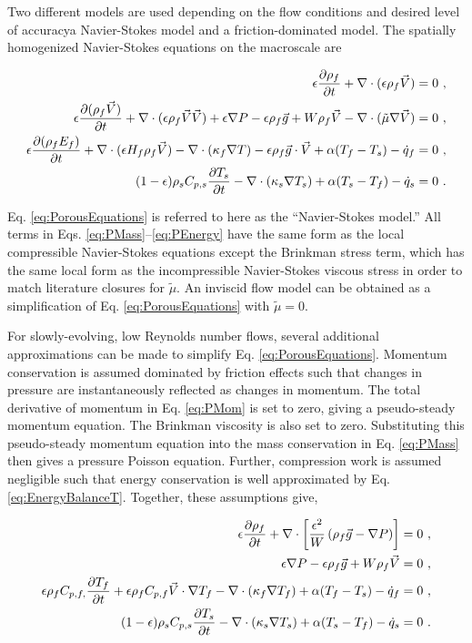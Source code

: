 Two different models are used depending on the flow conditions and desired level of accuracy\mdash a Navier-Stokes model and a friction-dominated model. The spatially homogenized Navier-Stokes equations on the macroscale are

\begin{subequations}
\label{eq:PorousEquations}
\begin{align}
\label{eq:PMass}\epsilon\frac{\partial\rho_f}{\partial t} + \nabla\cdot(\epsilon\rho_f\vec{V})=0\ ,\\
\label{eq:PMom}\epsilon\frac{\partial(\rho_f\vec{V})}{\partial t}+\nabla\cdot(\epsilon\rho_f\vec{V}\vec{V})+\epsilon\nabla P-\epsilon\rho_f\vec{g}+W\rho_f\vec{V}-\nabla\cdot(\tilde{\mu}\nabla\vec{V})=0\ ,\\
\label{eq:PEnergy}\epsilon\frac{\partial (\rho_f E_f)}{\partial t}+\nabla\cdot(\epsilon H_f\rho_f\vec{V})-\nabla\cdot(\kappa_f\nabla T)-\epsilon\rho_f \vec{g}\cdot\vec{V}+\alpha(T_f-T_s)-\dot{q}_f=0\ ,\\
\label{eq:PSEnergy}(1-\epsilon)\rho_sC_{p,s}\frac{\partial T_s}{\partial t}-\nabla\cdot(\kappa_s\nabla T_s)+\alpha(T_s-T_f)-\dot{q}_s=0\ .
\end{align}
\end{subequations}

\noindent Eq. \eqref{eq:PorousEquations} is referred to here as the ``Navier-Stokes model.'' All terms in Eqs. \eqref{eq:PMass}--\eqref{eq:PEnergy} have the same form as the local compressible Navier-Stokes equations except the Brinkman stress term, which has the same local form as the incompressible Navier-Stokes viscous stress in order to match literature closures for \(\tilde{\mu}\). An inviscid flow model can be obtained as a simplification of Eq. \eqref{eq:PorousEquations} with \(\tilde{\mu}=0\).

For slowly-evolving, low Reynolds number flows, several additional approximations can be made to simplify Eq. \eqref{eq:PorousEquations}. Momentum conservation is assumed dominated by friction effects such that changes in pressure are instantaneously reflected as changes in momentum. The total derivative of momentum in Eq. \eqref{eq:PMom} is set to zero, giving a pseudo-steady momentum equation. The Brinkman viscosity is also set to zero. Substituting this pseudo-steady momentum equation into the mass conservation in Eq. \eqref{eq:PMass} then gives a pressure Poisson equation. Further, compression work is assumed negligible such that energy conservation is well approximated by Eq. \eqref{eq:EnergyBalanceT}. Together, these assumptions give,

\begin{subequations}
\label{eq:PrimitiveEqns}
\begin{align}
\label{eq:PMass2}
\epsilon\frac{\partial\rho_f}{\partial t}+\nabla\cdot\left\lbrack\frac{\epsilon^2}{W}\left(\rho_f\vec{g}-\nabla P\right)\right\rbrack=0\ ,\\
\label{eq:PMom2}
\epsilon\nabla P-\epsilon\rho_f\vec{g}+W\rho_f\vec{V}=0\ ,\\
\label{eq:PEnergy2}
\epsilon\rho_fC_{p,f,}\frac{\partial T_f}{\partial t}+\epsilon\rho_fC_{p,f}\vec{V}\cdot\nabla T_f-\nabla\cdot(\kappa_f\nabla T_f)+\alpha(T_f-T_s)-\dot{q}_f=0\ ,\\
\label{eq:PSEnergy2}
(1-\epsilon)\rho_sC_{p,s}\frac{\partial T_s}{\partial t}-\nabla\cdot(\kappa_s\nabla T_s)+\alpha(T_s-T_f)-\dot{q}_s=0\ .
\end{align}
\end{subequations}

